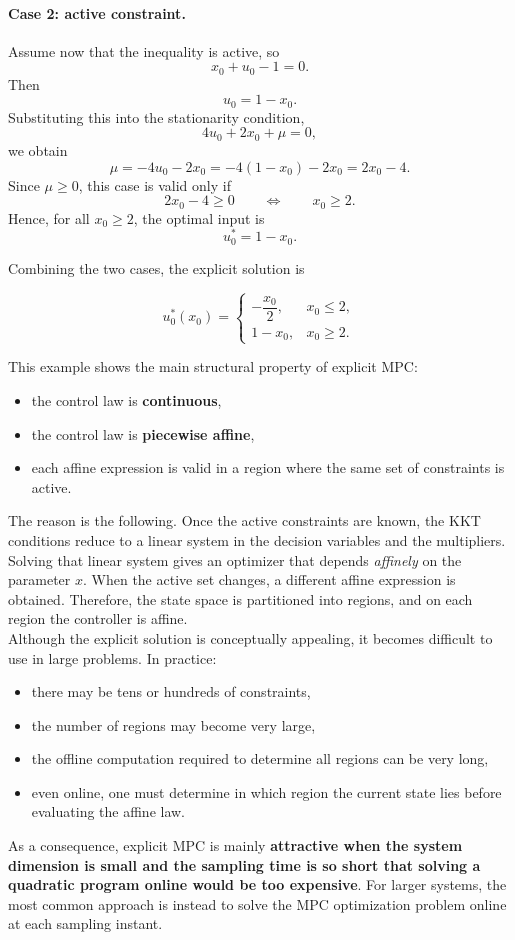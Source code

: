 \paragraph{Case 2: active constraint.}
Assume now that the inequality is active, so
\[
x_0 + u_0 - 1 = 0.
\]
Then
\[
u_0 = 1 - x_0.
\]
Substituting this into the stationarity condition,
\[
4u_0 + 2x_0 + \mu = 0,
\]
we obtain
\[
\mu = -4u_0 - 2x_0 = -4(1-x_0)-2x_0 = 2x_0 - 4.
\]
Since $\mu \ge 0$, this case is valid only if
\[
2x_0 - 4 \ge 0
\qquad \Longleftrightarrow \qquad
x_0 \ge 2.
\]
Hence, for all $x_0 \ge 2$, the optimal input is
\[
u_0^* = 1 - x_0.
\]

Combining the two cases, the explicit solution is
\begin{theorembox}
\[
u_0^*(x_0)=
\begin{cases}
-\dfrac{x_0}{2}, & x_0 \le 2, \\[1ex]
1-x_0, & x_0 \ge 2.
\end{cases}
\]
\end{theorembox}

This example shows the main structural property of explicit MPC:
\begin{itemize}
    \item the control law is \textbf{continuous},
    \item the control law is \textbf{piecewise affine},
    \item each affine expression is valid in a region where the same set of constraints is active.
\end{itemize}
The reason is the following. Once the active constraints are known, the KKT conditions reduce to a linear system in the decision variables and the multipliers. Solving that linear system gives an optimizer that depends \emph{affinely} on the parameter $x$. When the active set changes, a different affine expression is obtained. Therefore, the state space is partitioned into regions, and on each region the controller is affine.\\

Although the explicit solution is conceptually appealing, it becomes difficult to use in large problems. In practice:
\begin{itemize}
    \item there may be tens or hundreds of constraints,
    \item the number of regions may become very large,
    \item the offline computation required to determine all regions can be very long,
    \item even online, one must determine in which region the current state lies before evaluating the affine law.
\end{itemize}
As a consequence, explicit MPC is mainly \textbf{attractive when the system dimension is small and the sampling time is so short that solving a quadratic program online would be too expensive}. For larger systems, the most common approach is instead to solve the MPC optimization problem online at each sampling instant.

